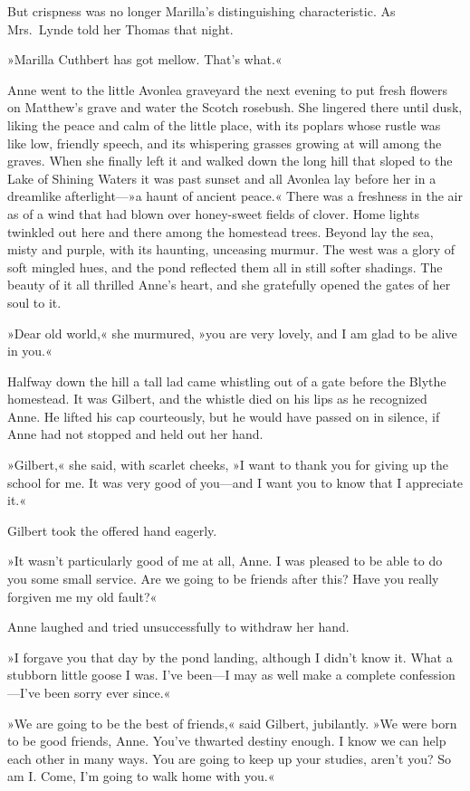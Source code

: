 But crispness was no longer Marilla's distinguishing characteristic. As Mrs.~Lynde told her Thomas that night.

»Marilla Cuthbert has got mellow. That's what.«

Anne went to the little Avonlea graveyard the next evening to put fresh flowers on Matthew's grave and water the Scotch rosebush. She lingered there until dusk, liking the peace and calm of the little place, with its poplars whose rustle was like low, friendly speech, and its whispering grasses growing at will among the graves. When she finally left it and walked down the long hill that sloped to the Lake of Shining Waters it was past sunset and all Avonlea lay before her in a dreamlike afterlight—»a haunt of ancient peace.« There was a freshness in the air as of a wind that had blown over honey-sweet fields of clover. Home lights twinkled out here and there among the homestead trees. Beyond lay the sea, misty and purple, with its haunting, unceasing murmur. The west was a glory of soft mingled hues, and the pond reflected them all in still softer shadings. The beauty of it all thrilled Anne's heart, and she gratefully opened the gates of her soul to it.

»Dear old world,« she murmured, »you are very lovely, and I am glad to be alive in you.«

Halfway down the hill a tall lad came whistling out of a gate before the Blythe homestead. It was Gilbert, and the whistle died on his lips as he recognized Anne. He lifted his cap courteously, but he would have passed on in silence, if Anne had not stopped and held out her hand.

»Gilbert,« she said, with scarlet cheeks, »I want to thank you for giving up the school for me. It was very good of you—and I want you to know that I appreciate it.«

Gilbert took the offered hand eagerly.

»It wasn't particularly good of me at all, Anne. I was pleased to be able to do you some small service. Are we going to be friends after this? Have you really forgiven me my old fault?«

Anne laughed and tried unsuccessfully to withdraw her hand.

»I forgave you that day by the pond landing, although I didn't know it. What a stubborn little goose I was. I've been—I may as well make a complete confession—I've been sorry ever since.«

»We are going to be the best of friends,« said Gilbert, jubilantly. »We were born to be good friends, Anne. You've thwarted destiny enough. I know we can help each other in many ways. You are going to keep up your studies, aren't you? So am I. Come, I'm going to walk home with you.«

